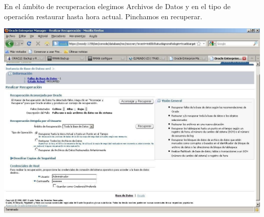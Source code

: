 \begin{enumerate}[1.]
\begin{center}
	\end{center}
	En el ámbito de recuperacion elegimos Archivos de Datos y en el tipo de operación restaurar hasta hora actual. Pinchamos en recuperar.
	\begin{center}
	\includegraphics[width=15cm]{./Imagenes/eje8}
	\end{center}








\end{enumerate} 
